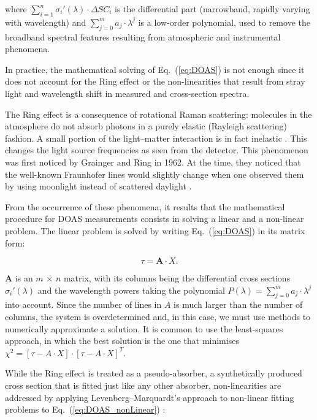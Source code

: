 where $\sum_{i = 1}^{n} \sigma_{i}{'}(\lambda) \cdot \Delta SC_{i}$ is
the differential part (narrowband, rapidly varying with wavelength) and
$\sum_{j = 0}^{m} a_{j} \cdot \lambda^{j}$ is a low-order polynomial,
used to remove the broadband spectral features resulting from
atmospheric and instrumental phenomena.


In practice, the mathematical solving of Eq.~(\ref{eq:DOAS}) is not
enough since it does not account for the Ring effect or the
non-linearities that result from stray light and wavelength shift in
measured and cross-section spectra.

The Ring effect is a consequence of rotational Raman scattering:
molecules in the atmosphere do not absorb photons in a purely elastic
(Rayleigh scattering) fashion. A small portion of the light--matter
interaction is in fact inelastic \cite{Brinkmann1968,Merlaud2013}. This
changes the light source frequencies as seen from the detector. This
phenomenon was first noticed by Grainger and Ring in 1962. At the time,
they noticed that the well-known Fraunhofer lines would slightly change
when one  observed them by using moonlight instead of scattered daylight
\cite{GRAINGER1962}.

From the occurrence of these phenomena, it results that the mathematical
procedure for DOAS measurements consists in solving a linear and a
non-linear problem. The linear problem is solved by writing
Eq.~(\ref{eq:DOAS}) in its matrix form:

\begin{equation}
      \label{eq:DOAS_matrix}
      \tau = \mathbf{A} \cdot X.
\end{equation}

$\mathbf{A}$ is an $m\,\times\,n$ matrix, with its columns being the
differential cross sections $\sigma_{i}{'}(\lambda)$ and the wavelength
powers taking the polynomial $P(\lambda) = \sum_{j = 0}^{m} a_{j} \cdot
\lambda^{j}$ into account. Since the number of lines in $A$ is much
larger than the number of columns, the system is overdetermined and, in
this case, we must use methods to numerically approximate a solution. It
is common to use the least-squares approach, in which the best solution
is the one that minimises $\chi^{2} = \left[\tau - A \cdot X\right]
\cdot \left[\tau - A \cdot X\right]^{T}$.

While the Ring effect is treated as a pseudo-absorber, a synthetically
produced~\cite{Chance1997} cross section that is fitted just like any
other absorber, non-linearities are addressed by applying
Levenberg--Marquardt's approach to non-linear fitting problems to
Eq.~(\ref{eq:DOAS_nonLinear}) \cite{Merlaud2013,Bevington2003}:


